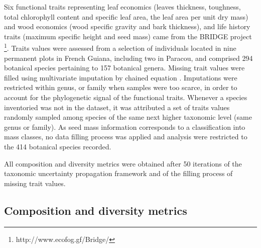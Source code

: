 \documentclass[fleqn,10pt]{ArtEcoFoG} %
\theoremstyle{definition}
\theoremstyle{definition}
\theoremstyle{definition}
\theoremstyle{remark}
\begin{document}
Six functional traits representing leaf economics (leaves thickness,
toughness, total chlorophyll content and specific leaf area, the leaf
area per unit dry mass) and wood economics (wood specific gravity and
bark thickness), and life history traits (maximum specific height and
seed mass) came from the BRIDGE project \footnote{http://www.ecofog.gf/Bridge/}.
Traits values were assessed from a selection of individuals located in
nine permanent plots in French Guiana, including two in Paracou, and
comprised 294 botanical species pertaining to 157 botanical genera.
Missing trait values were filled using multivariate imputation by
chained equation \citep{Mice2011}. Imputations were restricted within
genus, or family when samples were too scarce, in order to account for
the phylogenetic signal of the functional traits. Whenever a species
inventoried was not in the dataset, it was attributed a set of traits
values randomly sampled among species of the same next higher taxonomic
level (same genus or family). As seed mass information corresponds to a
classification into mass classes, no data filling process was applied
and analysis were restricted to the 414 botanical species recorded.

All composition and diversity metrics were obtained after 50 iterations
of the taxonomic uncertainty propagation framework and of the filling
process of missing trait values.

\subsection{Composition and diversity
metrics}\label{composition-and-diversity-metrics}
\end{document}
